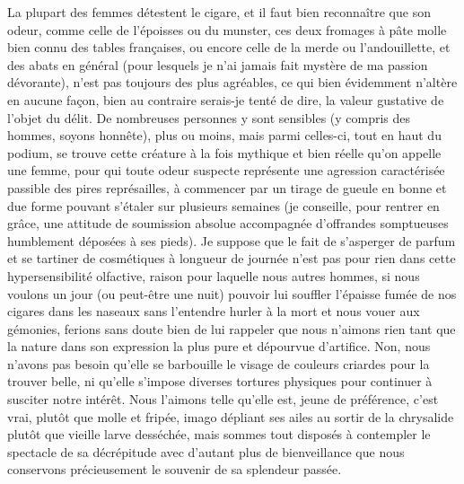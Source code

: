 La plupart des femmes détestent le cigare, et il faut bien reconnaître que son odeur, comme celle de l’époisses ou du munster, ces deux fromages à pâte molle bien connu des tables françaises, ou encore celle de la merde ou l’andouillette, et des abats en général (pour lesquels je n’ai jamais fait mystère de ma passion dévorante), n’est pas toujours des plus agréables, ce qui bien évidemment n’altère en aucune façon, bien au contraire serais-je tenté de dire, la valeur gustative de l’objet du délit. De nombreuses personnes y sont sensibles (y compris des hommes, soyons honnête), plus ou moins, mais parmi celles-ci, tout en haut du podium, se trouve cette créature à la fois mythique et bien réelle qu’on appelle une femme, pour qui toute odeur suspecte représente une agression caractérisée passible des pires représailles, à commencer par un tirage de gueule en bonne et due forme pouvant s’étaler sur plusieurs semaines (je conseille, pour rentrer en grâce, une attitude de soumission absolue accompagnée d’offrandes somptueuses humblement déposées à ses pieds). Je suppose que le fait de s’asperger de parfum et se tartiner de cosmétiques à longueur de journée n’est pas pour rien dans cette hypersensibilité olfactive, raison pour laquelle nous autres hommes, si nous voulons un jour (ou peut-être une nuit) pouvoir lui souffler l’épaisse fumée de nos cigares dans les naseaux sans l’entendre hurler à la mort et nous vouer aux gémonies, ferions sans doute bien de lui rappeler que nous n’aimons rien tant que la nature dans son expression la plus pure et dépourvue d’artifice. Non, nous n’avons pas besoin qu’elle se barbouille le visage de couleurs criardes pour la trouver belle, ni qu’elle s’impose diverses tortures physiques pour continuer à susciter notre intérêt. Nous l’aimons telle qu’elle est, jeune de préférence, c’est vrai, plutôt que molle et fripée, imago dépliant ses ailes au sortir de la chrysalide plutôt que vieille larve desséchée, mais sommes tout disposés à contempler le spectacle de sa décrépitude avec d’autant plus de bienveillance que nous conservons précieusement le souvenir de sa splendeur passée.

\illusloflabel{}%
%

